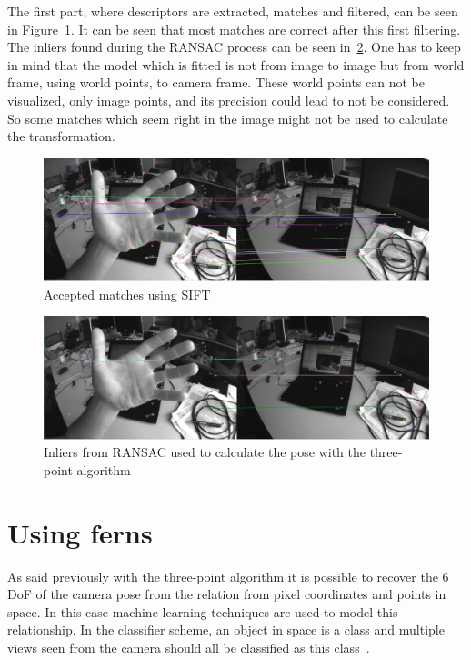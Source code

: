 The first part, where descriptors are extracted, matches and filtered, can be seen in Figure~\ref{fig:3pt_matches}.  It can be seen that most matches are correct after this first filtering.\\

The inliers found during the RANSAC process can be seen in~\ref{fig:3pt_inliers}. One has to keep in mind that the model which is fitted  is not from image to image but from world frame, using world points, to camera frame. These world points can not be visualized, only image points, and its precision could lead to not be considered. So some matches which seem right in the image might not be used to calculate the transformation.\\

\begin{figure}[htpb]
  \centering
  \includegraphics[width=1.0\linewidth]{img/3pt_matches_1.png}
  \caption{Accepted matches using SIFT}
  \label{fig:3pt_matches}
\end{figure}


\begin{figure}[htpb]
  \centering
  \includegraphics[width=1.0\linewidth]{img/3pt_inliers_1.png}
  \caption{Inliers from RANSAC used to calculate the pose with the three-point algorithm }
  \label{fig:3pt_inliers}
\end{figure}


\section{Using ferns}
\label{sec:using_ferns}

As said previously with the three-point algorithm it is possible to recover the 6 DoF of the camera pose from the relation from pixel coordinates and points in space. In this case machine learning techniques are used to model this relationship. In the classifier scheme, an object in space is a class and multiple views seen from the camera should all be classified as this class~\cite{}.\\

